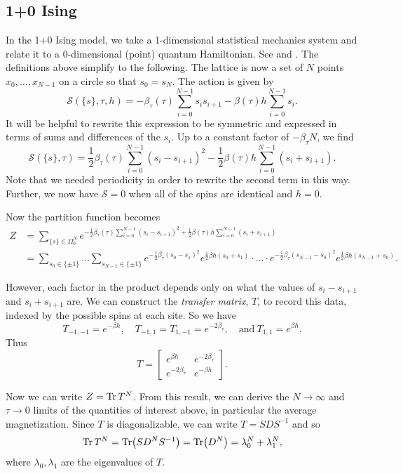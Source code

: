 \documentclass[11pt,reqno]{amsart}
\begin{document}
	\subsection{1+0 Ising}
	
	In the 1+0 Ising model, we take a 1-dimensional statistical mechanics system and relate it to a 0-dimensional (point) quantum Hamiltonian. See \cite{FradkinSusskind78} and \cite{KogutGaugeSummary}.
	The definitions above simplify to the following. The lattice is now a set of $N$ points $x_0,\ldots,x_{N-1}$ on a circle so that $s_0=s_N$. The action is given by 
		\[\mathcal{S}(\{s\},\tau, h)=-\beta_\tau(\tau)\sum_{i=0}^{N-1} s_is_{i+1} - \beta(\tau)h\sum_{i=0}^{N-1}s_i. \] 
	It will be helpful to rewrite this expression to be symmetric and expressed in terms of sums and differences of the $s_i$. 
	Up to a constant factor of $-\beta_\tau N$, we find
		\[\mathcal{S}(\{s\},\tau)=\frac{1}{2}\beta_\tau(\tau)\sum_{i=0}^{N-1} (s_i-s_{i+1})^2 - \frac{1}{2}\beta(\tau)h\sum_{i=0}^{N-1}(s_i+s_{i+1}). \]
	Note that we needed periodicity in order to rewrite the second term in this way. Further, we now have $\mathcal{S}=0$ when all of the spins are identical and $h=0$.
	
	Now the partition function becomes 
	\begin{align*}
		Z&=\sum_{\{s\}\in\Omega_0^N} e^{-\frac{1}{2}\beta_\tau(\tau)\sum_{i=0}^{N-1} (s_i-s_{i+1})^2 + \frac{1}{2}\beta(\tau)h\sum_{i=0}^{N-1}(s_i+s_{i+1})} \\
		&=\sum_{s_0 \in \{\pm 1\}} \ldots \sum_{s_{N-1}\in \{\pm 1\}} e^{-\frac{1}{2}\beta_\tau (s_0-s_1)^2}e^{\frac{1}{2}\beta h(s_0+s_1)}\cdot\ldots\cdot e^{-\frac{1}{2}\beta_\tau (s_{N-1}-s_0)^2}e^{\frac{1}{2}\beta h(s_{N-1}+s_0)}.
	\end{align*}
	
	However, each factor in the product depends only on what the values of $s_i-s_{i+1}$ and $s_i+s_{i+1}$ are. 
	We can construct the \emph{transfer matrix}, $T$, to record this data, indexed by the possible spins at each site.
	So we have 
	\[T_{-1,-1}=e^{-\beta h}, \quad T_{-1,1}=T_{1,-1}=e^{-2\beta_\tau}, \quad \text{and}\ T_{1,1}=e^{\beta h}. \] 
	Thus \[T=\begin{bmatrix}
	e^{\beta h} & e^{-2\beta_\tau} \\
	e^{-2\beta_\tau} & e^{-\beta h}
	\end{bmatrix}. \]
	
	Now we can write $Z=\Tr T^N$.
	From this result, we can derive the $N\to \infty$ and $\tau \to 0$ limits of the quantities of interest above, in particular the average magnetization.
	Since $T$ is diagonalizable, we can write $T=SDS^{-1}$ and so 
		\[\Tr T^N=\Tr(SD^NS^{-1})=\Tr(D^N)=\lambda_0^N+\lambda_1^N,\]
	where $\lambda_0,\lambda_1$ are the eigenvalues of $T$.
	
\end{document}
